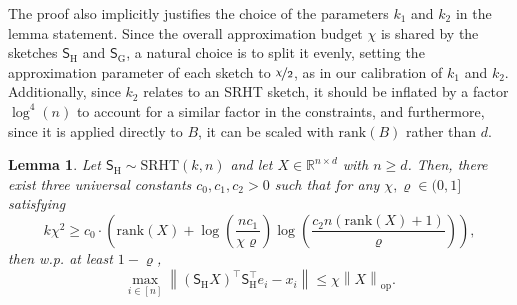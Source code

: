 \documentclass[11pt]{article}
\newtheorem{lem}{Lemma}
\theoremstyle{definition}
\theoremstyle{plain}
\newcommand{\Norm}[1]{\left\| #1 \right\|}
\providecommand{\norm}[1]{\Norm{#1}}
\begin{document}
The proof also implicitly justifies the choice of the parameters $k_1$ and $k_2$ in the lemma statement. Since the overall approximation budget $\chi$ is shared by the sketches $\mathsf{S}_{\mathrm{H}}$ and $\mathsf{S}_{\mathrm{G}}$, a natural choice is to split it evenly, setting the approximation parameter of each sketch to $\nicefrac{\chi}{2}$, as in our calibration of $k_1$ and $k_2$. Additionally, since $k_2$ relates to an SRHT sketch, it should be inflated by a factor $\log^4(n)$ to account for a similar factor in the constraints, and furthermore, since it is applied directly to $B$, it can be scaled with $\mathrm{rank}(B)$ rather than $d$. 
\begin{lem}
\label{lem:nelson_prob}
Let $\mathsf{S}_{\mathrm{H}}\sim \mathrm{SRHT}(k, n)$ and let $X \in \mathbb{R}^{n\times d}$ with $n\geq d$. Then, there exist three universal constants $c_0,c_1,c_2>0$ such that for any $\chi,\varrho \in (0,1]$ satisfying
\begin{equation}
    k\chi^2 \geq c_0\cdot \left(\mathrm{rank}(X) + \log\left(\frac{n c_1}{\chi\varrho}\right)\log\left(\frac{c_2 n\left(\mathrm{rank}(X)+1\right)}{\varrho}\right)\right),
\end{equation}
then w.p. at least $1-\varrho$,
\begin{equation}
    \max_{i\in[n]} \norm{\left(\mathsf{S}_{\mathrm{H}}X\right)^{\top}\mathsf{S}^{\top}_{\mathrm{H}}e_i - x_i} \leq \chi \norm{X}_{\mathrm{op}}.
\end{equation}
\end{lem}
\end{document}
